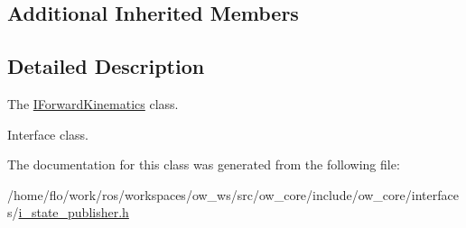 \subsection*{Additional Inherited Members}


\subsection{Detailed Description}
The \hyperlink{classow_1_1IForwardKinematics}{I\+Forward\+Kinematics} class. 

Interface class. 

The documentation for this class was generated from the following file\+:\begin{DoxyCompactItemize}
\item 
/home/flo/work/ros/workspaces/ow\+\_\+ws/src/ow\+\_\+core/include/ow\+\_\+core/interfaces/\hyperlink{i__state__publisher_8h}{i\+\_\+state\+\_\+publisher.\+h}\end{DoxyCompactItemize}
